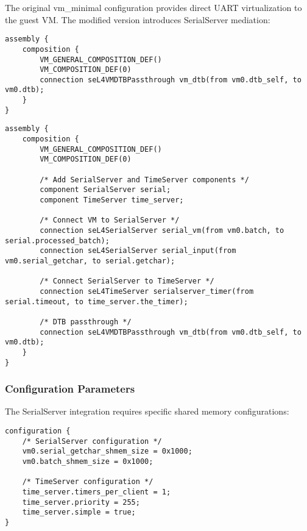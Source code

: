 \documentclass[12pt,a4paper]{article}
\begin{document}
The original vm\_minimal configuration provides direct UART virtualization to the guest VM. The modified version introduces SerialServer mediation:

\begin{lstlisting}[style=camkes, caption=Original vm\_minimal composition]
assembly {
    composition {
        VM_GENERAL_COMPOSITION_DEF()
        VM_COMPOSITION_DEF(0)
        connection seL4VMDTBPassthrough vm_dtb(from vm0.dtb_self, to vm0.dtb);
    }
}
\end{lstlisting}

\begin{lstlisting}[style=camkes, caption=Modified vm\_minimal\_serial composition]
assembly {
    composition {
        VM_GENERAL_COMPOSITION_DEF()
        VM_COMPOSITION_DEF(0)
        
        /* Add SerialServer and TimeServer components */
        component SerialServer serial;
        component TimeServer time_server;
        
        /* Connect VM to SerialServer */
        connection seL4SerialServer serial_vm(from vm0.batch, to serial.processed_batch);
        connection seL4SerialServer serial_input(from vm0.serial_getchar, to serial.getchar);
        
        /* Connect SerialServer to TimeServer */
        connection seL4TimeServer serialserver_timer(from serial.timeout, to time_server.the_timer);
        
        /* DTB passthrough */
        connection seL4VMDTBPassthrough vm_dtb(from vm0.dtb_self, to vm0.dtb);
    }
}
\end{lstlisting}

\subsubsection{Configuration Parameters}

The SerialServer integration requires specific shared memory configurations:

\begin{lstlisting}[style=camkes, caption=SerialServer configuration parameters]
configuration {
    /* SerialServer configuration */
    vm0.serial_getchar_shmem_size = 0x1000;
    vm0.batch_shmem_size = 0x1000;
    
    /* TimeServer configuration */
    time_server.timers_per_client = 1;
    time_server.priority = 255;
    time_server.simple = true;
}
\end{lstlisting}
\end{document}
